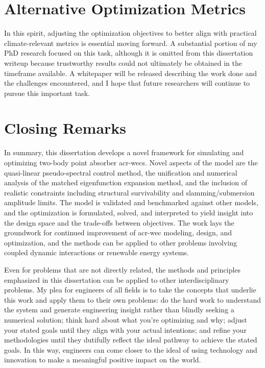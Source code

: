 \section{Alternative Optimization Metrics}
\ifdefined\DECIDER
\else
    In this spirit, adjusting the optimization objectives to better align with practical climate-relevant metrics is essential moving forward.
    A substantial portion of my PhD research focused on this task, although it is omitted from this dissertation writeup because trustworthy results could not ultimately be obtained in the timeframe available.
    A whitepaper will be released describing the work done and the challenges encountered,
    and I hope that future researchers will continue to pursue this important task.
\fi

\section{Closing Remarks}
In summary, this dissertation develops a novel framework for simulating and optimizing two-body point absorber \glspl{acr-wec}.
Novel aspects of the model are the quasi-linear pseudo-spectral control method, the unification and numerical analysis of the matched eigenfunction expansion method, and the inclusion of realistic constraints including structural survivability and slamming/submersion amplitude limits.
The model is validated and benchmarked against other models, and the optimization is formulated, solved, and interpreted to yield insight into the design space and the trade-offs between objectives.
The work lays the groundwork for continued improvement of \gls{acr-wec} modeling, design, and optimization, and the methods can be applied to other problems involving coupled dynamic interactions or renewable energy systems.

Even for problems that are not directly related, the methods and principles emphasized in this dissertation can be applied to other interdisciplinary problems.
My plea for engineers of all fields is to take the concepts that underlie this work and apply them to their own problems: 
do the hard work to understand the system and generate engineering insight rather than blindly seeking a numerical solution;
think hard about what you're optimizing and why;
adjust your stated goals until they align with your actual intentions;
and refine your methodologies until they dutifully reflect the ideal pathway to achieve the stated goals.
In this way, engineers can come closer to the ideal of using technology and innovation to make a meaningful positive impact on the world.